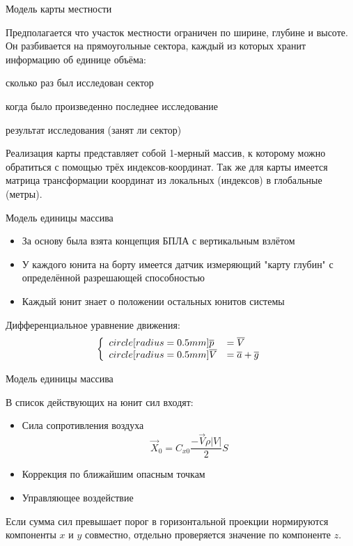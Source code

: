 \begin{tslide}{Модель карты местности}

    Предполагается что участок местности ограничен по ширине,
    глубине и высоте.
    Он разбивается на прямоугольные сектора, каждый из которых хранит
    информацию об единице объёма:

    \begin{mintemize}
    \item сколько раз был исследован сектор
    \item когда было произведенно последнее исследование
    \item результат исследования (занят ли сектор)
    \end{mintemize}

    Реализация карты представляет собой 1-мерный массив,
    к которому можно обратиться с помощью трёх индексов-координат.
    Так же для карты имеется матрица трансформации координат
    из локальных (индексов) в глобальные (метры).

\end{tslide}

\begin{tslide}{Модель единицы массива}
    
    \begin{itemize}
    \item За основу была взята концепция БПЛА с вертикальным взлётом
    \item У каждого юнита на борту имеется датчик измеряющий "карту глубин"
        с определённой разрешающей способностью
    \item Каждый юнит знает о положении остальных юнитов системы
    \end{itemize}

    Дифференциальное уравнение движения:
    $$
    \left\{
        \begin{array}{l l}
        \dot{\vec{p}}  & = \vec V \\
        \dot{\vec{V}}  & = \vec a + \vec g
        \end{array}
    \right.
    $$

\end{tslide}
\begin{tslide}{Модель единицы массива}
    
    В список действующих на юнит сил входят:
    \begin{itemize}
    \item Сила сопротивления воздуха
        $$\vec X_0 = C_{x0}\frac{-\vec V \rho |V|}{2} S$$
    \item Коррекция по ближайшим опасным точкам
    \item Управляющее воздействие
    \end{itemize}

    Если сумма сил превышает порог в горизонтальной проекции
    нормируются компоненты $x$ и $y$ совместно, отдельно проверяется
    значение по компоненте $z$.

\end{tslide}

